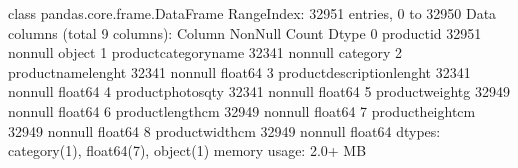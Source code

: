 \documentclass[letterpaper,10pt,english]{jupyterBook}
\begin{document}
\begin{sphinxVerbatim}[commandchars=\\\{\}]
\PYG{p}{[}\PYG{p}{]}  \PYG{p}{[}\PYG{p}{]}
\end{sphinxVerbatim}

\begin{sphinxVerbatim}[commandchars=\\\{\}]
\PYGZlt{}class \PYGZsq{}pandas.core.frame.DataFrame\PYGZsq{}\PYGZgt{}
RangeIndex: 32951 entries, 0 to 32950
Data columns (total 9 columns):
 \PYGZsh{}   Column                      Non\PYGZhy{}Null Count  Dtype   
\PYGZhy{}\PYGZhy{}\PYGZhy{}  \PYGZhy{}\PYGZhy{}\PYGZhy{}\PYGZhy{}\PYGZhy{}\PYGZhy{}                      \PYGZhy{}\PYGZhy{}\PYGZhy{}\PYGZhy{}\PYGZhy{}\PYGZhy{}\PYGZhy{}\PYGZhy{}\PYGZhy{}\PYGZhy{}\PYGZhy{}\PYGZhy{}\PYGZhy{}\PYGZhy{}  \PYGZhy{}\PYGZhy{}\PYGZhy{}\PYGZhy{}\PYGZhy{}   
 0   product\PYGZus{}id                  32951 non\PYGZhy{}null  object  
 1   product\PYGZus{}category\PYGZus{}name       32341 non\PYGZhy{}null  category
 2   product\PYGZus{}name\PYGZus{}lenght         32341 non\PYGZhy{}null  float64 
 3   product\PYGZus{}description\PYGZus{}lenght  32341 non\PYGZhy{}null  float64 
 4   product\PYGZus{}photos\PYGZus{}qty          32341 non\PYGZhy{}null  float64 
 5   product\PYGZus{}weight\PYGZus{}g            32949 non\PYGZhy{}null  float64 
 6   product\PYGZus{}length\PYGZus{}cm           32949 non\PYGZhy{}null  float64 
 7   product\PYGZus{}height\PYGZus{}cm           32949 non\PYGZhy{}null  float64 
 8   product\PYGZus{}width\PYGZus{}cm            32949 non\PYGZhy{}null  float64 
dtypes: category(1), float64(7), object(1)
memory usage: 2.0+ MB
\end{sphinxVerbatim}

\begin{sphinxVerbatim}[commandchars=\\\{\}]
\end{sphinxVerbatim}
\end{document}
